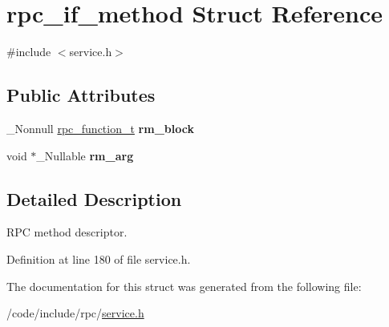 \hypertarget{structrpc__if__method}{}\section{rpc\+\_\+if\+\_\+method Struct Reference}
\label{structrpc__if__method}


{\ttfamily \#include $<$service.\+h$>$}

\subsection*{Public Attributes}
\begin{DoxyCompactItemize}
\item 
\mbox{\label{structrpc__if__method_a5db192112740ed1adb36f74ff7c92a80}} 
\+\_\+\+Nonnull \hyperlink{service_8h_ae49a22468cfcd4adfa558078e9e4e312}{rpc\+\_\+function\+\_\+t} {\bfseries rm\+\_\+block}
\item 
\mbox{\label{structrpc__if__method_a85a2f339a726ef4afb885cbf157c0998}} 
void $\ast$\+\_\+\+Nullable {\bfseries rm\+\_\+arg}
\end{DoxyCompactItemize}


\subsection{Detailed Description}
R\+PC method descriptor. 

Definition at line 180 of file service.\+h.



The documentation for this struct was generated from the following file\+:\begin{DoxyCompactItemize}
\item 
/code/include/rpc/\hyperlink{service_8h}{service.\+h}\end{DoxyCompactItemize}
